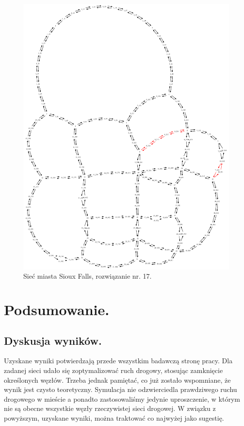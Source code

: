 \documentclass[twoside,12pt]{report}
\let\oldsection\chapter
\def\chapter{\cleardoublepage\oldsection}
\begin{document}
\begin{figure}[ht]
\centering
\includegraphics[totalheight=0.580\textheight, angle=90]{img/sioux-out/17/network2}
\caption{Sieć miasta Sioux Falls, rozwiązanie nr. 17.}
\label{sioux17}
\end{figure}


\chapter{Podsumowanie.}\label{rozdz.podsumowanie} 

\section{Dyskusja wyników.}
Uzyskane wyniki potwierdzają przede wszystkim badawczą stronę pracy. Dla zadanej sieci udało się zoptymalizować ruch drogowy, stosując zamknięcie określonych węzłów. Trzeba jednak pamiętać, co już zostało wspomniane, że wynik jest czysto teoretyczny. Symulacja nie odzwierciedla prawdziwego ruchu drogowego w mieście a ponadto zastosowaliśmy jedynie uproszczenie, w którym nie są obecne wszystkie węzły rzeczywistej sieci drogowej. W związku z powyższym, uzyskane wyniki, można traktować co najwyżej jako sugestię. 
\end{document}
